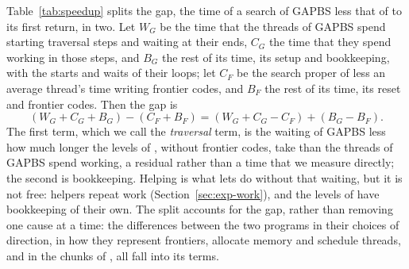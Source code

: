 Table~\ref{tab:speedup} splits the gap, the time of a search of GAPBS less that of \wfdo to its first return, in two. Let $W_G$ be the time that the threads of GAPBS spend starting traversal steps and waiting at their ends, $C_G$ the time that they spend working in those steps, and $B_G$ the rest of its time, its setup and bookkeeping, with the starts and waits of their loops; let $C_F$ be the search proper of \wfdo less an average thread's time writing frontier codes, and $B_F$ the rest of its time, its reset and frontier codes. Then the gap is
\[
(W_G + C_G + B_G) - (C_F + B_F) = (W_G + C_G - C_F) + (B_G - B_F).
\]
The first term, which we call the \emph{traversal} term, is the waiting of GAPBS less how much longer the levels of \wfdo, without frontier codes, take than the threads of GAPBS spend working, a residual rather than a time that we measure directly; the second is bookkeeping. Helping is what lets \wfdo do without that waiting, but it is not free: helpers repeat work (Section~\ref{sec:exp-work}), and the levels of \wfdo have bookkeeping of their own. The split accounts for the gap, rather than removing one cause at a time: the differences between the two programs in their choices of direction, in how they represent frontiers, allocate memory and schedule threads, and in the chunks of \wfdo, all fall into its terms.

